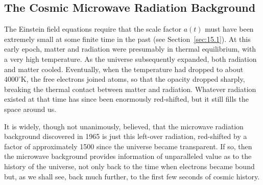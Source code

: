 
\subsection{The Cosmic Microwave Radiation Background}\label{sec:15.5}

The Einstein field equations require that the scale factor \(a(t)\) must have
been extremely small at some finite time in the past (see
Section~\ref{sec:15.1}). At this early epoch, matter and radiation were
presumably in thermal equilibrium, with a very high temperature. As the
universe subsequently expanded, both radiation and matter cooled. Eventually,
when the temperature had dropped to about \(4000^\circ\mathrm{K}\), the free
electrons joined atoms, so that the opacity dropped sharply, breaking the
thermal contact between matter and radiation. Whatever radiation existed at
that time has since been enormously red-shifted, but it still fills the space
around us.

It is widely, though not unanimously, believed, that the microwave radiation
background discovered in 1965 is just this left-over radiation, red-shifted by
a factor of approximately 1500 since the universe became transparent. If so,
then the microwave background provides information of unparalleled value as
to the history of the universe, not only back to the time when electrons became
bound but, as we shall see, back much further, to the first few seconds of
cosmic history.

